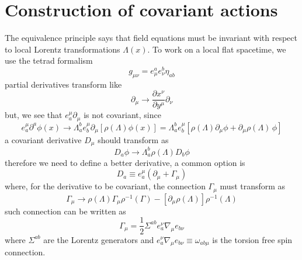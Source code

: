 \section{Construction of covariant actions}
The equivalence principle says that field equations must be invariant with respect to local Lorentz transformations $\Lambda(x)$. To work on a local flat spacetime, we use the tetrad formalism
\begin{equation}
	g_{\mu\nu}=e^a_\mu e^b_\nu \eta_{ab}
\end{equation}
partial derivatives transform like
\begin{equation}
	\partial_\mu\to\frac{\partial x^\nu}{\partial y^\mu}\partial_\nu
\end{equation}
but, we see that $e^\mu_a\partial_\mu$ is not covariant, since
\begin{equation}
	e^\mu_a\partial^a\phi(x)\to \Lambda^b_ae^\mu_b\partial_\mu\left[\rho\left(\Lambda\right)\phi(x)\right]= \Lambda^b_ae^\mu_b\left[\rho\left(\Lambda\right)\partial_\mu\phi+\partial_\mu\rho\left(\Lambda\right)\,\phi\right]
\end{equation}
a covariant derivative $D_\mu$ should transform as
\begin{equation}
	D_a\phi\to\Lambda_a^b\rho\left(\Lambda\right)D_b\phi
\end{equation}
therefore we need to define a better derivative, a common option is
\begin{equation}
	D_a\equiv e^\mu_a\left(\partial_\mu+\Gamma_\mu\right)
\end{equation}
where, for the derivative to be covariant, the connection $\Gamma_\mu$ must transform as
\begin{equation}
	\Gamma_\mu\to \rho\left(\Lambda\right)\Gamma_\mu\rho^{-1}\left(\Gamma\right)-\left[\partial_\mu\rho\left(\Lambda\right)\right]\rho^{-1}\left(\Lambda\right)
\end{equation} 
such connection can be written as
\begin{equation}
	\Gamma_\mu=\frac{1}{2}\Sigma^{ab}e^\nu_a\nabla_\mu e_{b\nu}
\end{equation}
where $\Sigma^{ab}$ are the Lorentz generators and $e^\nu_a\nabla_\mu e_{b\nu}\equiv \omega_{ab\mu}$ is the torsion free spin connection.


